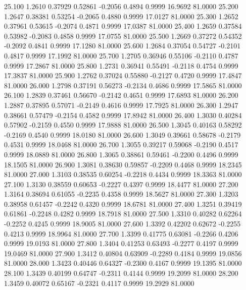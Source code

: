   25.100   1.2610   0.37929   0.52861  -0.2056   0.4894   0.9999  16.9692  81.0000
  25.200   1.2647   0.38381   0.53254  -0.2065   0.4880   0.9999  17.0127  81.0000
  25.300   1.2652   0.37961   0.53615  -0.2074   0.4871   0.9999  17.0387  81.0000
  25.400   1.2659   0.37584   0.53982  -0.2083   0.4858   0.9999  17.0755  81.0000
  25.500   1.2669   0.37272   0.54352  -0.2092   0.4841   0.9999  17.1280  81.0000
  25.600   1.2684   0.37054   0.54727  -0.2101   0.4817   0.9999  17.1992  81.0000
  25.700   1.2705   0.36946   0.55106  -0.2110   0.4787   0.9999  17.2867  81.0000
  25.800   1.2731   0.36941   0.55491  -0.2118   0.4754   0.9999  17.3837  81.0000
  25.900   1.2762   0.37024   0.55880  -0.2127   0.4720   0.9999  17.4847  81.0000
  26.000   1.2798   0.37191   0.56273  -0.2134   0.4686   0.9999  17.5865  81.0000
  26.100   1.2839   0.37461   0.56670  -0.2142   0.4651   0.9999  17.6893  81.0000
  26.200   1.2887   0.37895   0.57071  -0.2149   0.4616   0.9999  17.7925  81.0000
  26.300   1.2947   0.38661   0.57479  -0.2154   0.4582   0.9999  17.8942  81.0000
  26.400   1.3030   0.40284   0.57902  -0.2159   0.4550   0.9999  17.9888  81.0000
  26.500   1.3045   0.40163   0.58292  -0.2169   0.4540   0.9999  18.0180  81.0000
  26.600   1.3049   0.39661   0.58678  -0.2179   0.4531   0.9999  18.0468  81.0000
  26.700   1.3055   0.39217   0.59068  -0.2190   0.4517   0.9999  18.0889  81.0000
  26.800   1.3065   0.38861   0.59461  -0.2200   0.4496   0.9999  18.1505  81.0000
  26.900   1.3081   0.38630   0.59857  -0.2209   0.4468   0.9999  18.2345  81.0000
  27.000   1.3103   0.38535   0.60254  -0.2218   0.4434   0.9999  18.3363  81.0000
  27.100   1.3130   0.38559   0.60653  -0.2227   0.4397   0.9999  18.4477  81.0000
  27.200   1.3164   0.38694   0.61055  -0.2235   0.4358   0.9999  18.5627  81.0000
  27.300   1.3203   0.38958   0.61457  -0.2242   0.4320   0.9999  18.6781  81.0000
  27.400   1.3251   0.39419   0.61861  -0.2248   0.4282   0.9999  18.7918  81.0000
  27.500   1.3310   0.40282   0.62264  -0.2252   0.4245   0.9999  18.9005  81.0000
  27.600   1.3392   0.42202   0.62672  -0.2255   0.4213   0.9999  18.9964  81.0000
  27.700   1.3399   0.41775   0.63081  -0.2266   0.4206   0.9999  19.0193  81.0000
  27.800   1.3404   0.41253   0.63493  -0.2277   0.4197   0.9999  19.0469  81.0000
  27.900   1.3412   0.40804   0.63909  -0.2289   0.4184   0.9999  19.0856  81.0000
  28.000   1.3423   0.40446   0.64327  -0.2300   0.4167   0.9999  19.1395  81.0000
  28.100   1.3439   0.40199   0.64747  -0.2311   0.4144   0.9999  19.2099  81.0000
  28.200   1.3459   0.40072   0.65167  -0.2321   0.4117   0.9999  19.2929  81.0000
